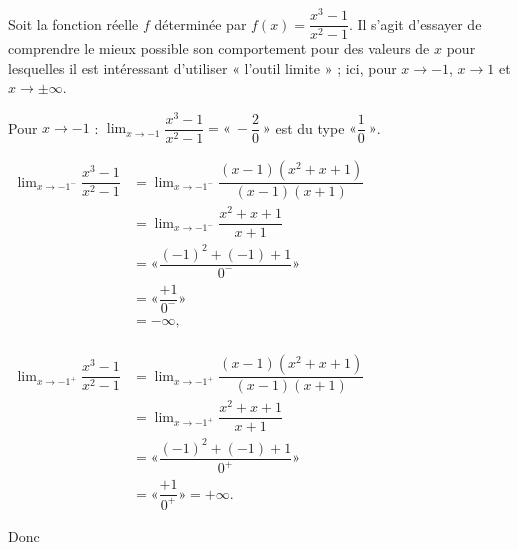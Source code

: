 \documentclass[a4paper,12pt]{article}
\begin{document}
\begin{exemple}
\tcblower
Soit la fonction réelle $f$ déterminée par $f(x)=\dfrac{x^3-1}{x^2-1}$. Il s'agit d'essayer de comprendre le mieux possible son comportement pour des valeurs de $x$ pour lesquelles il est intéressant d'utiliser « l'outil limite » ; ici, pour $x\to -1$, $x\to 1$ et $x\to \pm\infty$.

Pour $x\to -1$ : $\displaystyle\lim_{x\to -1}\dfrac{x^3-1}{x^2-1}=«~-\dfrac{2}{0}~»$ est du type $«\displaystyle\dfrac{1}{0}~»$.
\medskip

$\begin{aligned}
\displaystyle\lim_{x\to -1^-}\dfrac{x^3-1}{x^2-1}
&=\displaystyle\lim_{x\to -1^-}\dfrac{(x-1)(x^2+x+1)}{(x-1)(x+1)}\\
&=\displaystyle\lim_{x\to -1^-}\dfrac{x^2+x+1}{x+1}\\
&=«\dfrac{(-1)^2+(-1)+1}{0^-}»\\
&=«\dfrac{+1}{0^-}»\\
&=-\infty,\\
\end{aligned}$

	$\begin{aligned}
\displaystyle\lim_{x\to -1^+}\dfrac{x^3-1}{x^2-1}
&=\displaystyle\lim_{x\to -1^+}\dfrac{(x-1)(x^2+x+1)}{(x-1)(x+1)}\\
&=\displaystyle\lim_{x\to -1^+}\dfrac{x^2+x+1}{x+1}\\
&=« \dfrac{(-1)^2+(-1)+1}{0^+} »\\
&=« \dfrac{+1}{0^+} »=+\infty.
\end{aligned}$

Donc \\
\end{exemple}
\end{document}
